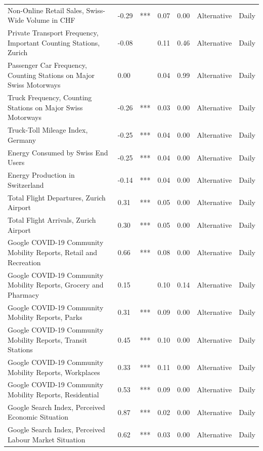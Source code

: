 \begin{table}[ht]
\begin{tabular}{lllrrll}
  Non-Online Retail Sales, Swiss-Wide Volume in CHF & -0.29 & *** & 0.07 & 0.00 & Alternative & Daily \\ 
  Private Transport Frequency, Important Counting Stations, Zurich & -0.08 &  & 0.11 & 0.46 & Alternative & Daily \\ 
  Passenger Car Frequency, Counting Stations on Major Swiss Motorways &  0.00 &  & 0.04 & 0.99 & Alternative & Daily \\ 
  Truck Frequency, Counting Stations on Major Swiss Motorways & -0.26 & *** & 0.03 & 0.00 & Alternative & Daily \\ 
  Truck-Toll Mileage Index, Germany & -0.25 & *** & 0.04 & 0.00 & Alternative & Daily \\ 
  Energy Consumed by Swiss End Users & -0.25 & *** & 0.04 & 0.00 & Alternative & Daily \\ 
  Energy Production in Switzerland & -0.14 & *** & 0.04 & 0.00 & Alternative & Daily \\ 
  Total Flight Departures, Zurich Airport &  0.31 & *** & 0.05 & 0.00 & Alternative & Daily \\ 
  Total Flight Arrivals, Zurich Airport &  0.30 & *** & 0.05 & 0.00 & Alternative & Daily \\ 
  Google COVID-19 Community Mobility Reports, Retail and Recreation &  0.66 & *** & 0.08 & 0.00 & Alternative & Daily \\ 
  Google COVID-19 Community Mobility Reports, Grocery and Pharmacy &  0.15 &  & 0.10 & 0.14 & Alternative & Daily \\ 
  Google COVID-19 Community Mobility Reports, Parks &  0.31 & *** & 0.09 & 0.00 & Alternative & Daily \\ 
  Google COVID-19 Community Mobility Reports, Transit Stations &  0.45 & *** & 0.10 & 0.00 & Alternative & Daily \\ 
  Google COVID-19 Community Mobility Reports, Workplaces &  0.33 & *** & 0.11 & 0.00 & Alternative & Daily \\ 
  Google COVID-19 Community Mobility Reports, Residential &  0.53 & *** & 0.09 & 0.00 & Alternative & Daily \\ 
  Google Search Index, Perceived Economic Situation &  0.87 & *** & 0.02 & 0.00 & Alternative & Daily \\ 
  Google Search Index, Perceived Labour Market Situation &  0.62 & *** & 0.03 & 0.00 & Alternative & Daily \\ 
   \hline
\end{tabular}
\end{table}
